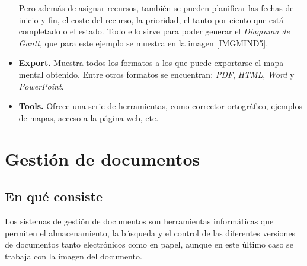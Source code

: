 \documentclass[11pt,a4paper,spanish,twoside]{report}
\begin{document}
\begin{itemize}

            Pero además de asignar recursos, también se pueden
            planificar las fechas de inicio y fin, el coste del recurso, la
            prioridad, el tanto por ciento que está completado o el
            estado. Todo ello sirve para poder generar el \emph{Diagrama de
              Gantt}, que para este ejemplo se muestra en la imagen
            \ref{IMGMIND5}.


          \item \textbf{Export.} Muestra todos los formatos a los que puede
            exportarse el mapa mental obtenido. Entre otros formatos se
            encuentran: \emph{PDF}, \emph{HTML}, \emph{Word} y
            \emph{PowerPoint}.

          \item \textbf{Tools.} Ofrece una serie de herramientas, como
            corrector ortográfico, ejemplos de mapas, acceso a la página web,
            etc.

        \end{itemize}

\chapter{Gestión de documentos}
\section{En qué consiste}

Los sistemas de gestión de documentos son herramientas informáticas que
permiten el almacenamiento, la búsqueda y el control de las diferentes
versiones de documentos tanto electrónicos como en papel, aunque en este
último caso se trabaja con la imagen del documento. 
\end{document}
